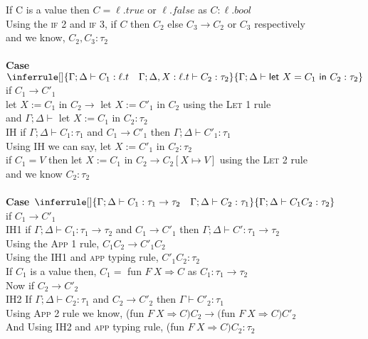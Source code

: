 \documentclass{article}
\begin{document}
If C is a value then $C = \ell.true$ or $ \ell.false$ as $C : \ell.bool$\\
Using the \textsc{if 2} and \textsc{if 3},  if $C$ then $C_2$ else $C_3 \to C_2$ or $C_3$ respectively \\
and we know, $C_2, C_3 : \tau_2$
\\\\
\textbf{Case $\inferrule []
{ \Gamma;\Delta \vdash C_1 : \ell.t \quad \Gamma;\Delta, X : \ell.t \vdash C_2 : \tau_2 }
{ \Gamma;\Delta \vdash \textsf{let } X = C_1 \textsf{ in } C_2 : \tau_2 }$ } \\
if $C_1 \to C'_1$ \\
let $ X := C_1$ in $ C_2 \to $ let $ X := C'_1$ in $ C_2$ using the \textsc{Let 1} rule\\
and $\Gamma; \Delta \vdash$ let $ X := C_1$ in $ C_2 : \tau_2$ \\ 
IH if $\Gamma;\Delta \vdash C_1 : \tau_1$ and  $C_1 \to C'_1$ then $\Gamma; \Delta \vdash C'_1 : \tau_1$ \\
Using IH we can say, let $ X := C'_1$ in $ C_2 : \tau_2$\\
if $C_1 = V$ then let $ X := C_1$ in $ C_2 \to C_2[X \mapsto V]$ using the \textsc{Let 2} rule\\
and we know $C_2 : \tau_2$
\\\\
\textbf{Case $\inferrule []
{ \Gamma;\Delta \vdash C_1 : \tau_1 \to \tau_2 \quad \Gamma;\Delta \vdash C_2 : \tau_1 }
{ \Gamma;\Delta \vdash C_1 C_2 : \tau_2  }$ } \\
if $C_1 \to C'_1$ \\
IH1 if $\Gamma;\Delta \vdash C_1 : \tau_1 \to \tau_2$ and  $C_1 \to C'_1$ then $\Gamma; \Delta \vdash C' : \tau_1 \to \tau_2$ \\
Using the \textsc{App 1} rule, $C_1 C_2 \to C'_1 C_2$ \\
Using the IH1 and \textsc{app} typing rule, $C'_1 C_2 : \tau_2$ \\
If $C_1$ is a value then, $ C_1 =$ fun $F \ X \Rightarrow C$ as $C_1 : \tau_1 \to \tau_2$ \\
Now if $C_2 \to C'_2$ \\
IH2 If $\Gamma;\Delta \vdash C_2 : \tau_1$ and  $C_2 \to C'_2$ then $\Gamma \vdash C'_2 : \tau_1$ \\
Using \textsc{App 2} rule we know, (fun $F \ X \Rightarrow C) C_2 \to ($fun $F \ X \Rightarrow C) C'_2$ \\
And Using IH2 and \textsc{app} typing rule, (fun $F \ X \Rightarrow C) C_2 : \tau_2$ \\
\end{document}

